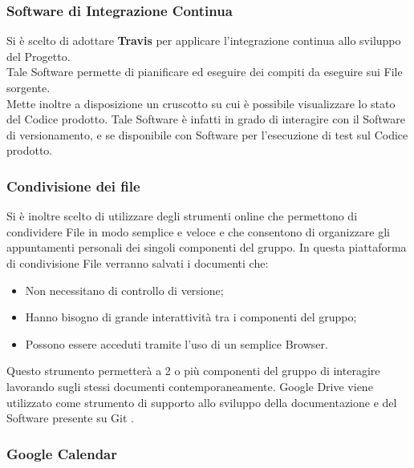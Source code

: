 \subsubsection{Software di Integrazione Continua}

Si è scelto di adottare \textbf{Travis} per applicare l’integrazione continua allo sviluppo del Progetto.\\ 
Tale Software permette di pianificare ed eseguire dei compiti da eseguire sui File sorgente.\\
Mette inoltre a disposizione un cruscotto su cui è possibile visualizzare lo stato del Codice prodotto. Tale Software è infatti in grado di interagire con il Software di versionamento, e se disponibile con Software per l’esecuzione di test sul Codice prodotto.\\ 



\subsubsection{Condivisione dei file}
  \label{sec:condivisioneFile}
  Si è inoltre scelto di utilizzare degli strumenti online che permettono di condividere File
  in modo semplice e veloce e che consentono di organizzare gli appuntamenti personali
  dei singoli componenti del gruppo.
  In questa piattaforma di condivisione File verranno salvati i documenti che:
  \begin{itemize}
  
  
  \item Non necessitano di controllo di versione;
  \item Hanno bisogno di grande interattività tra i componenti del gruppo;
  \item Possono essere acceduti tramite l’uso di un semplice Browser.
   \end{itemize}
  Questo strumento permetterà a 2 o più componenti del gruppo di interagire lavorando sugli stessi documenti contemporaneamente. Google Drive viene utilizzato come strumento di supporto allo sviluppo della documentazione e del Software presente su Git .
  


\subsubsection{Google Calendar}
 
